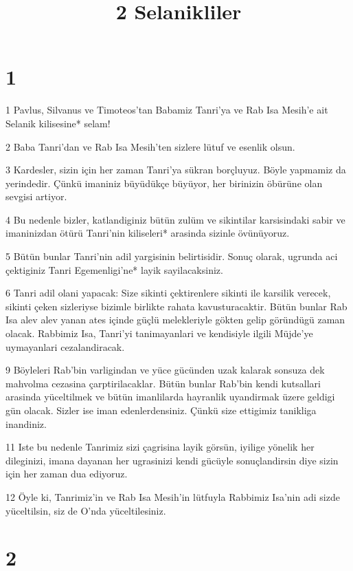 

\title{2 Selanikliler}


\chapter{1}

\par 1 Pavlus, Silvanus ve Timoteos'tan Babamiz Tanri'ya ve Rab Isa Mesih'e ait Selanik kilisesine* selam!
\par 2 Baba Tanri'dan ve Rab Isa Mesih'ten sizlere lütuf ve esenlik olsun.
\par 3 Kardesler, sizin için her zaman Tanri'ya sükran borçluyuz. Böyle yapmamiz da yerindedir. Çünkü imaniniz büyüdükçe büyüyor, her birinizin öbürüne olan sevgisi artiyor.
\par 4 Bu nedenle bizler, katlandiginiz bütün zulüm ve sikintilar karsisindaki sabir ve imaninizdan ötürü Tanri'nin kiliseleri* arasinda sizinle övünüyoruz.
\par 5 Bütün bunlar Tanri'nin adil yargisinin belirtisidir. Sonuç olarak, ugrunda aci çektiginiz Tanri Egemenligi'ne* layik sayilacaksiniz.
\par 6 Tanri adil olani yapacak: Size sikinti çektirenlere sikinti ile karsilik verecek, sikinti çeken sizleriyse bizimle birlikte rahata kavusturacaktir. Bütün bunlar Rab Isa alev alev yanan ates içinde güçlü melekleriyle gökten gelip göründügü zaman olacak. Rabbimiz Isa, Tanri'yi tanimayanlari ve kendisiyle ilgili Müjde'ye uymayanlari cezalandiracak.
\par 9 Böyleleri Rab'bin varligindan ve yüce gücünden uzak kalarak sonsuza dek mahvolma cezasina çarptirilacaklar. Bütün bunlar Rab'bin kendi kutsallari arasinda yüceltilmek ve bütün imanlilarda hayranlik uyandirmak üzere geldigi gün olacak. Sizler ise iman edenlerdensiniz. Çünkü size ettigimiz tanikliga inandiniz.
\par 11 Iste bu nedenle Tanrimiz sizi çagrisina layik görsün, iyilige yönelik her dileginizi, imana dayanan her ugrasinizi kendi gücüyle sonuçlandirsin diye sizin için her zaman dua ediyoruz.
\par 12 Öyle ki, Tanrimiz'in ve Rab Isa Mesih'in lütfuyla Rabbimiz Isa'nin adi sizde yüceltilsin, siz de O'nda yüceltilesiniz.

\chapter{2}


